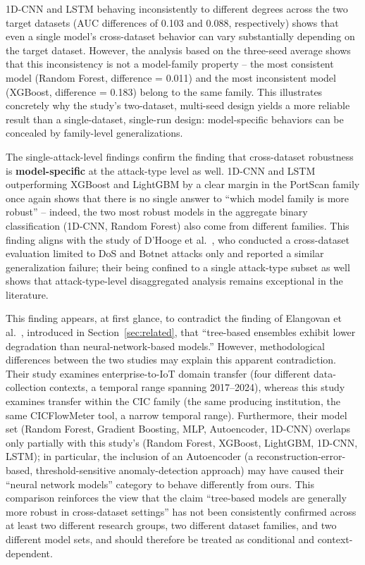 \documentclass[a4paper,fleqn]{cas-sc}
\begin{document}
1D-CNN and LSTM behaving inconsistently to different degrees across the two target datasets (AUC differences of 0.103 and 0.088, respectively) shows that even a single model's cross-dataset behavior can vary substantially depending on the target dataset. However, the analysis based on the three-seed average shows that this inconsistency is not a model-family property -- the most consistent model (Random Forest, difference = 0.011) and the most inconsistent model (XGBoost, difference = 0.183) belong to the same family. This illustrates concretely why the study's two-dataset, multi-seed design yields a more reliable result than a single-dataset, single-run design: model-specific behaviors can be concealed by family-level generalizations.

The single-attack-level findings confirm the finding that cross-dataset robustness is \textbf{model-specific} at the attack-type level as well. 1D-CNN and LSTM outperforming XGBoost and LightGBM by a clear margin in the PortScan family once again shows that there is no single answer to ``which model family is more robust'' -- indeed, the two most robust models in the aggregate binary classification (1D-CNN, Random Forest) also come from different families. This finding aligns with the study of D'Hooge et al.~\cite{Dhooge2020}, who conducted a cross-dataset evaluation limited to DoS and Botnet attacks only and reported a similar generalization failure; their being confined to a single attack-type subset as well shows that attack-type-level disaggregated analysis remains exceptional in the literature.

This finding appears, at first glance, to contradict the finding of Elangovan et al.~\cite{Elangovan2026}, introduced in Section~\ref{sec:related}, that ``tree-based ensembles exhibit lower degradation than neural-network-based models.'' However, methodological differences between the two studies may explain this apparent contradiction. Their study examines enterprise-to-IoT domain transfer (four different data-collection contexts, a temporal range spanning 2017--2024), whereas this study examines transfer within the CIC family (the same producing institution, the same CICFlowMeter tool, a narrow temporal range). Furthermore, their model set (Random Forest, Gradient Boosting, MLP, Autoencoder, 1D-CNN) overlaps only partially with this study's (Random Forest, XGBoost, LightGBM, 1D-CNN, LSTM); in particular, the inclusion of an Autoencoder (a reconstruction-error-based, threshold-sensitive anomaly-detection approach) may have caused their ``neural network models'' category to behave differently from ours. This comparison reinforces the view that the claim ``tree-based models are generally more robust in cross-dataset settings'' has not been consistently confirmed across at least two different research groups, two different dataset families, and two different model sets, and should therefore be treated as conditional and context-dependent.
\end{document}
